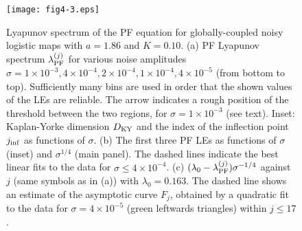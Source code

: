 \documentclass[12pt]{iopart}
\begin{document}
\begin{figure}[t]
  \texttt{[image: fig4-3.eps]}
  \caption{Lyapunov spectrum of the PF equation for globally-coupled noisy logistic maps  with $a=1.86$ and $K=0.10$. (a) PF Lyapunov spectrum $\lambda_{\rm PF}^{(j)}$ for various noise amplitudes
 $\sigma = 1 \times 10^{-3}, 4 \times 10^{-4}, 2 \times 10^{-4}, 1 \times 10^{-4}, 4 \times 10^{-5}$ (from bottom to top).
Sufficiently many bins are used in order that the shown values of the LEs are reliable.
The arrow indicates a rough position of the threshold between the two regions, for $\sigma = 1 \times 10^{-3}$ (see text).
Inset: Kaplan-Yorke dimension $D_{\rm KY}$ and the index of the inflection point $j_{\rm inf}$ as functions of $\sigma$. (b) The first three PF LEs as functions of $\sigma$ (inset) and $\sigma^{1/4}$ (main panel). The dashed lines indicate the best linear fits to the data for $\sigma \leq 4 \times 10^{-4}$. (c) $(\lambda_0 - \lambda_{\rm PF}^{(j)}) \sigma^{-1/4}$ against $j$ (same symbols as in (a)) with $\lambda_0 = 0.163$.
The dashed line shows an estimate of the asymptotic curve $F_j$, obtained by a quadratic fit to the data for $\sigma = 4 \times 10^{-5}$ (green leftwards triangles) within $j \leq 17$.}
  \label{fig:4-3}
\end{figure}%
\end{document}
